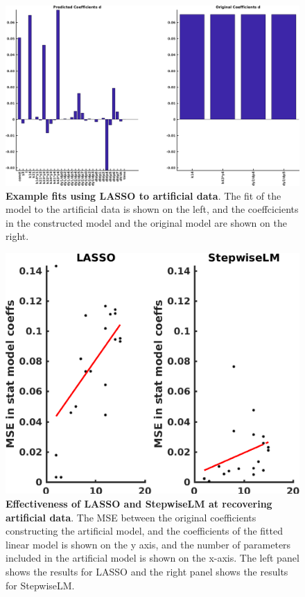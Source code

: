 \documentclass[11pt,a4paper,oneside]{article}
\begin{document}
\begin{figure}[t]
\begin{center}
\includegraphics[scale=0.21]{Figures/LassoArtificialExample2_Coeffs.png}
\caption{\textbf{Example fits using LASSO to artificial data}. The fit of the model to the artificial data is shown on the left, and the coeffcicients in the constructed model and the original model are shown on the right.} 
\label{Fig_LassoArtificialExample}
\end{center}
\end{figure}

\begin{figure}[bt]
\begin{center}
\includegraphics[scale=0.42]{Figures/BatchFitToData.png}
\caption{\textbf{Effectiveness of LASSO and StepwiseLM at recovering artificial data}. The MSE between the original coefficients constructing the artificial model, and the coefficients of the fitted linear model is shown on the y axis, and the number of parameters included in the artificial model is shown on the x-axis. The left panel shows the results for LASSO and the right panel shows the results for StepwiseLM.} 
\label{Fig_BatchArtificialFits}
\end{center}
\end{figure}
\end{document}
